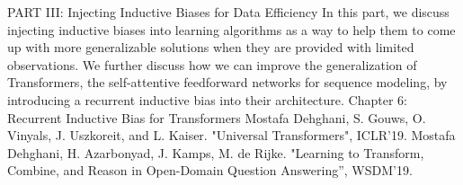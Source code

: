 PART III: Injecting Inductive Biases for Data Efficiency
In this part, we discuss injecting inductive biases into learning algorithms as a way to help them to come up with more generalizable solutions when they are provided with limited observations. We further discuss how we can improve the generalization of Transformers, the self-attentive feedforward networks for sequence modeling, by introducing a recurrent inductive bias into their architecture.
Chapter 6: Recurrent Inductive Bias for Transformers
Mostafa Dehghani, S. Gouws, O. Vinyals, J. Uszkoreit, and L. Kaiser. "Universal Transformers", ICLR'19.
Mostafa Dehghani, H. Azarbonyad, J. Kamps, M. de Rijke. "Learning to Transform, Combine, and Reason in Open-Domain Question Answering'', WSDM'19.




